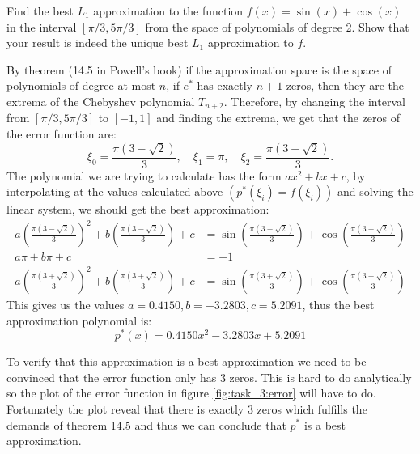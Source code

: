 \begin{problem}
Find the best $L_1$ approximation to the function $f(x) = \sin(x) + \cos(x)$ in the interval $[\pi/3, 5\pi/3]$ from the space of polynomials of degree 2. Show that your result is indeed the unique best $L_1$ approximation to $f$.
\end{problem}

\begin{solution}
  By theorem (14.5 in Powell's book) if the approximation space is the
  space of polynomials of degree at most $n$, if $e^*$ has exactly
  $n+1$ zeros, then they are the extrema of the Chebyshev polynomial
  $T_{n+2}$. Therefore, by changing the interval from
  $[\pi/3, 5\pi/3]$ to $[-1,1]$ and finding the extrema, we get that
  the zeros of the error function are:
\begin{equation*}
  \xi_0 = \frac{\pi(3-\sqrt{2})}{3}, \quad \xi_1 = \pi, \quad \xi_2 = \frac{\pi(3+\sqrt{2})}{3}.
\end{equation*}
The polynomial we are trying to calculate has the form $ax^2+bx+c$, by
interpolating at the values calculated above $(p^*(\xi_i) = f(\xi_i))$
and solving the linear system, we should get the best approximation:
\begin{align*}
a\left(\frac{\pi(3-\sqrt{2})}{3}\right)^2+b\left(\frac{\pi(3-\sqrt{2})}{3}\right)+c &= \sin\left(\frac{\pi(3-\sqrt{2})}{3}\right) + \cos\left(\frac{\pi(3-\sqrt{2})}{3}\right) \\
a \pi + b\pi +c &=-1 \\
a\left(\frac{\pi(3+\sqrt{2})}{3}\right)^2 +b\left(\frac{\pi(3+\sqrt{2})}{3}\right) + c &= \sin\left(\frac{\pi(3+\sqrt{2})}{3}\right) + \cos\left(\frac{\pi(3+\sqrt{2})}{3}\right)
\end{align*}
This gives us the values $a=0.4150, b = -3.2803, c = 5.2091$, thus the
best approximation polynomial is:
\begin{equation*}
p^*(x)=0.4150x^2 -3.2803x+5.2091
\end{equation*}

To verify that this approximation is a best approximation we need to
be convinced that the error function only has 3 zeros. This is hard to
do analytically so the plot of the error function in figure
\ref{fig:task_3:error} will have to do. Fortunately the plot reveal
that there is exactly 3 zeros which fulfills the demands of theorem
14.5 and thus we can conclude that $p^*$ is a best approximation. 


\end{solution}
